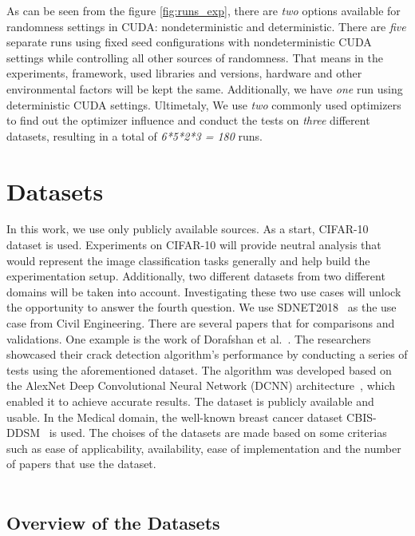 As can be seen from the figure \ref{fig:runs_exp}, there are \emph{two} options available for randomness settings in CUDA: nondeterministic and deterministic.
There are \emph{five} separate runs using fixed seed configurations
with nondeterministic CUDA settings while controlling all other sources of randomness. That means in the experiments,
framework, used libraries and versions, hardware and other environmental factors will be kept the same.
Additionally, we have \emph{one} run using deterministic CUDA settings.
Ultimetaly, We use \emph{two} commonly used optimizers to find out the optimizer influence and conduct the tests on \emph{three} different datasets,
resulting in a total of \emph{6*5*2*3 = 180}  runs.

\section{Datasets}

In this work, we use only publicly available sources. As a start, CIFAR-10~\cite{krizhevsky2009learning} dataset is used. Experiments on CIFAR-10 will 
provide neutral analysis that would represent the image classification tasks generally and help build the experimentation setup. Additionally,
two different datasets from two different domains will be taken into account. Investigating these two use cases will unlock the 
opportunity to answer the fourth question. 
We use SDNET2018~\cite{maguire2018sdnet2018} as the use case from Civil Engineering. There are several papers that for comparisons and validations. One example is the
work of Dorafshan et al.~\cite{dorafshan2018sdnet2018}.
The researchers showcased their crack detection algorithm's performance by conducting a series of tests using the aforementioned dataset.
The algorithm was developed based on the AlexNet Deep Convolutional Neural Network (DCNN) architecture~\cite{krizhevsky2017imagenet}, which enabled it to achieve accurate results. The dataset is publicly available and usable. 
In the Medical domain, the well-known breast cancer dataset CBIS-DDSM~\cite{spanhol2015dataset} is used.  
The choises of the datasets are made based on some criterias such as ease of applicability, availability, ease of implementation and the number of papers that use the dataset.
\\
\\
\subsection{Overview of the Datasets}

